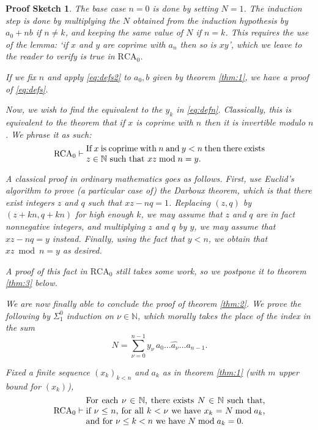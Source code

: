 \documentclass{article}
\theoremstyle{nonumberplain}
\newtheorem{sketch}{Proof Sketch}
\newcommand{\N}{\mathbb{N}}
\newcommand{\RCA}{\mathrm{RCA}}
\begin{document}
\begin{sketch}
The base case $n = 0$ is done by setting $N = 1$. The induction step is done by multiplying the $N$ obtained from the induction hypothesis by $a_0 + n b$ if $n \neq k$, and keeping the same value of $N$ if $n = k$. This requires the use of the lemma: `if $x$ and $y$ are coprime with $a_n$ then so is $xy$', which we leave to the reader to verify is true in $\RCA_0$.

If we fix $n$ and apply \eqref{eq:defs2} to $a_0, b$ given by theorem \ref{thm:1}, we have a proof of \eqref{eq:defs}.

Now, we wish to find the equivalent to the $y_k$ in \eqref{eq:defn}. Classically, this is equivalent to the theorem that if $x$ is coprime with $n$ then it is invertible modulo $n$. We phrase it as such:
\begin{equation}\label{eq:coprime}
\RCA_0 \vdash \parbox{21em}{If $x$ is coprime with $n$ and $y < n$ then there exists $z \in \N$ such that $xz \bmod n = y$.}
\end{equation}

A classical proof in ordinary mathematics goes as follows. First, use Euclid's algorithm to prove (a particular case of) the Darboux theorem, which is that there exist integers $z$ and $q$ such that $xz - nq = 1$. Replacing $(z,q)$ by $(z+kn, q+kn)$ for high enough $k$, we may assume that $z$ and $q$ are in fact nonnegative integers, and multiplying $z$ and $q$ by $y$, we may assume that $xz - nq = y$ instead. Finally, using the fact that $y < n$, we obtain that $xz \bmod n = y$ as desired.

A proof of this fact in $\RCA_0$ still takes some work, so we postpone it to theorem \ref{thm:3} below.

\medskip

We are now finally able to conclude the proof of theorem \ref{thm:2}. We prove the following by $\Sigma^0_1$ induction on $\nu \in \N$, which morally takes the place of the index in the sum
\begin{equation}
N = \sum_{\nu = 0}^{n-1} y_\nu \, a_0 \dots \widehat{a_\nu} \dots a_{n-1}.
\end{equation}

Fixed a finite sequence $(x_k)_{k < n}$ and $a_k$ as in theorem \ref{thm:1} (with $m$ upper bound for $(x_k)$),
\begin{equation}\label{eq:nu}
\RCA_0 \vdash \parbox{21em}{For each $\nu \in \N$, there exists $N \in \N$ such that, if $\nu \leq n$, for all $k < \nu$ we have $x_k = N \bmod a_k$, and for $\nu \leq k < n$ we have $N \bmod a_k = 0$.}
\end{equation}


\end{sketch}
\end{document}
